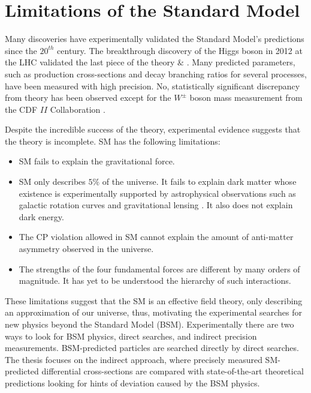 \section{Limitations of the Standard Model}	
\label{sec:SM_Incomplete}

Many discoveries have experimentally validated the Standard Model's predictions since the $20^{th}$ century. The breakthrough discovery of the Higgs boson in 2012 at the LHC validated the last piece of the theory \cite{CMSHiggsDiscovery}$\&$ \cite{ATLASHiggsDiscovery}. Many predicted parameters, such as production cross-sections and decay branching ratios for several processes, have been measured with high precision. No, statistically significant discrepancy from theory has been observed except for the $W^{\pm}$ boson mass measurement from the CDF $II$ Collaboration \cite{CDFWMass}.

Despite the incredible success of the theory, experimental evidence suggests that the theory is incomplete. SM has the following limitations:

\begin{itemize}

\item{SM fails to explain the gravitational force.}

\item{SM only describes $5\%$ of the universe. It fails to explain dark matter whose existence is experimentally supported by astrophysical observations such as galactic rotation curves and gravitational lensing \cite{DMGravitationalLensing}. It also does not explain dark energy. }

\item{The CP violation allowed in SM cannot explain the amount of anti-matter asymmetry observed in the universe. }

\item{ The strengths of the four fundamental forces are different by many orders of magnitude. It has yet to be understood the hierarchy of such interactions.}
\end{itemize}
 
These limitations suggest that the SM is an effective field theory, only describing an approximation of our universe, thus, motivating the experimental searches for new physics beyond the Standard Model (BSM). Experimentally there are two ways to look for BSM physics, direct searches, and indirect precision measurements. BSM-predicted particles are searched directly by direct searches. The thesis focuses on the indirect approach, where precisely measured SM-predicted differential cross-sections are compared with state-of-the-art theoretical predictions looking for hints of deviation caused by the BSM physics. 